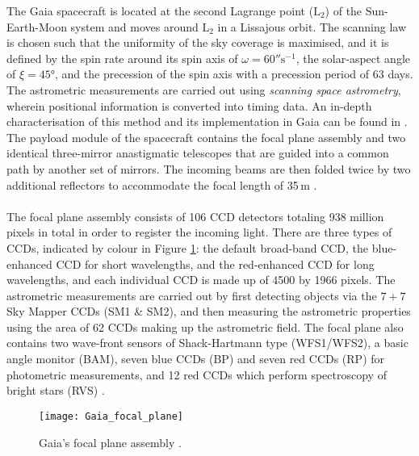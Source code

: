 \documentclass[a4paper,11pt]{article}
\begin{document}
The Gaia spacecraft is located at the second Lagrange point ($\mathrm{L}_2$) of the Sun-Earth-Moon system and moves around $\mathrm{L}_2$ in a Lissajous orbit. The scanning law is chosen such that the uniformity of the sky coverage is maximised, and it is defined by the spin rate around its spin axis of $\omega=60''\mathrm{s}^{-1}$, the solar-aspect angle of $\xi=45$°, and the precession of the spin axis with a precession period of 63 days. The astrometric measurements are carried out using \emph{scanning space astrometry}, wherein positional information is converted into timing data. An in-depth characterisation of this method and its implementation in Gaia can be found in \citep{lindebas10}. The payload module of the spacecraft \citep{holl12} contains the focal plane assembly and two identical three-mirror anastigmatic telescopes that are guided into a common path by another set of mirrors. The incoming beams are then folded twice by two additional reflectors to accommodate the focal length of 35\,m \citep{gaia}.\\ \\
%
The focal plane assembly consists of 106 CCD detectors totaling 938 million pixels in total in order to register the incoming light. There are three types of CCDs, indicated by colour in Figure \ref{fig:gaia_focal_plane}: the default broad-band CCD, the blue-enhanced CCD for short wavelengths, and the red-enhanced CCD for long wavelengths, and each individual CCD is made up of 4500 by 1966 pixels. The astrometric measurements are carried out by first detecting objects via the $7+7$ Sky Mapper CCDs (SM1 \& SM2), and then measuring the astrometric properties using the area of 62 CCDs making up the astrometric field. The focal plane also contains two wave-front sensors of Shack-Hartmann type (WFS1/WFS2), a basic angle monitor (BAM), seven blue CCDs (BP) and seven red CCDs (RP) for photometric measurements, and 12 red CCDs which perform spectroscopy of bright stars (RVS) \citep{jordi10}.
%
\begin{figure}
 \centering
 \texttt{[image: Gaia\_focal\_plane]}
 \caption[Gaia's focal plane assembly]{Gaia's focal plane assembly \citep{gaia}.}
 \label{fig:gaia_focal_plane}
\end{figure}\\ \\
%
\end{document}
